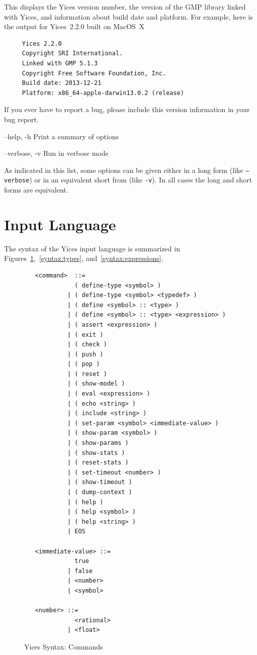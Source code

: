 \documentclass[11pt,twoside,fleqn,openright,titlepage]{cslreport}
\newenvironment{options}{
\begin{list}{}{
\setlength{\labelsep}{1.8ex}
\setlength{\labelwidth}{0pt}
\setlength{\itemindent}{-0.5\leftmargin}
\settowidth{\leftmargin}{\texttt{--}}
\renewcommand{\makelabel}{\optionlabel}}}
{\end{list}}
\newcommand*\optionlabel[1]{\hspace\labelsep\texttt{#1}}
\begin{document}
\begin{options}
  This  displays the  Yices version  number,  the version  of the  GMP
  library  linked with  Yices, and  information about  build date  and
  platform. For example,  here is the output for  Yices~2.2.0 built on
  MacOS~X
  \begin{small}
  \begin{verbatim}
     Yices 2.2.0
     Copyright SRI International.
     Linked with GMP 5.1.3
     Copyright Free Software Foundation, Inc.
     Build date: 2013-12-21
     Platform: x86_64-apple-darwin13.0.2 (release)
  \end{verbatim}
  \end{small}
  \vspace*{-1em}
  If you ever have to report a bug, please include this version information
  in your bug report.

\item[--help, -h] Print a summary of options

\item[--verbose, -v] Run in verbose mode
\end{options}
As indicated in this list, some options can be given either in a long
form (like \texttt{--verbose}) or in an equivalent short from (like
\texttt{-v}). In all cases the long and short forms are equivalent.

\section{Input Language}

The   syntax  of   the   Yices  input   language   is  summarized   in
Figures~\ref{syntax:commands},~\ref{syntax:types},
and~\ref{syntax:expressions}.


\begin{figure}
\begin{small}
\begin{verbatim}
   <command>  ::=
              ( define-type <symbol> )
            | ( define-type <symbol> <typedef> )
            | ( define <symbol> :: <type> )
            | ( define <symbol> :: <type> <expression> )
            | ( assert <expression> )
            | ( exit )
            | ( check )
            | ( push )
            | ( pop )
            | ( reset )
            | ( show-model )
            | ( eval <expression> )
            | ( echo <string> )
            | ( include <string> )
            | ( set-param <symbol> <immediate-value> )
            | ( show-param <symbol> )
            | ( show-params )
            | ( show-stats )
            | ( reset-stats )
            | ( set-timeout <number> )
            | ( show-timeout )
            | ( dump-context )
            | ( help )
            | ( help <symbol> )
            | ( help <string> )
            | EOS

   <immediate-value> ::=
              true
            | false
            | <number>
            | <symbol>

   <number> ::=
              <rational>
            | <float>
\end{verbatim}
\end{small}
\caption{Yices Syntax: Commands}
\label{syntax:commands}
\end{figure}
\end{document}
